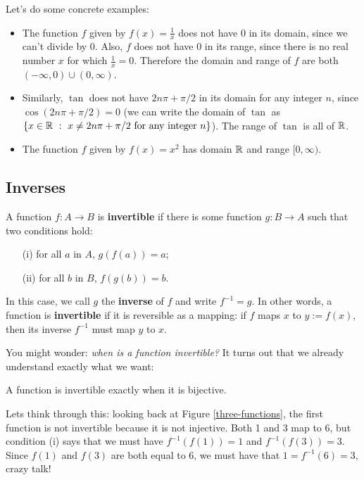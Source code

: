 Let's do some concrete examples:
\begin{itemize}
\item The function $f$ given by $f(x)=\frac{1}{x}$ does not have 0 in its domain, since we can't divide by 0. Also, $f$ does not have 0 in its range, since there is no real number $x$ for which $\frac{1}{x}=0$. Therefore the domain and range of $f$ are both $(-\infty,0)\cup(0,\infty)$.
\item Similarly, $\tan$ does not have $2n\pi+\pi/2$ in its domain for any integer $n$, since $\cos(2n\pi+\pi/2)=0$ (we can write the domain of $\tan$ as $\{x\in\mathbb{R}\ :\ x\neq 2n\pi + \pi/2\text{ for any integer }n\}$).  The range of $\tan$ is all of $\mathbb{R}$.
\item The function $f$ given by $f(x)=x^2$ has domain $\mathbb{R}$ and range $[0,\infty)$. 
\end{itemize}





\subsection{Inverses}
A function $f:A\to B$ is \textbf{invertible} if there is some function $g:B\to A$ such that two conditions hold:
\begin{enumerate}
\item[(i)] for all $a$ in $A$, $g(f(a))=a$;
\item[(ii)] for all $b$ in $B$, $f(g(b))=b$.
\end{enumerate}
In this case, we call $g$ the \textbf{inverse} of $f$ and write $f^{-1}=g$. In other words, a function is \textbf{invertible} if it is reversible as a mapping: if $f$ maps $x$ to $y:=f(x)$, then its inverse $f^{-1}$ must map $y$ to $x$. 

You might wonder: \textit{when is a function invertible?} It turns out that we already understand exactly what we want:
\begin{thm}
A function is invertible exactly when it is bijective.
\end{thm}
Lets think through this: looking back at Figure \ref{three-functions}, the first function is not invertible because it is not injective. Both 1 and 3 map to 6, but condition (i) says that we must have $f^{-1}(f(1))=1$ and $f^{-1}(f(3))=3$. Since $f(1)$ and $f(3)$ are both equal to $6$, we must have that $1=f^{-1}(6)=3$, crazy talk!

